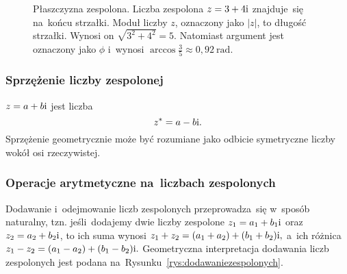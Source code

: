 \begin{figure}[h]
	\centering
	\caption{Płaszczyzna zespolona. Liczba zespolona $z=3+4{\mathrm i}$
		znajduje~się na~końcu strzałki. Moduł liczby $z$, oznaczony jako $|z|$,
		to długość strzałki. Wynosi on $\sqrt{3^2+4^2}=5$. Natomiast
		argument jest oznaczony jako $\phi$ i~wynosi $\arccos{\frac{3}{5}}\approx 0{,}92\ \mathrm{rad}.$}
	\label{rys:postaćgeometryczna}
\end{figure}

\subsubsection{Sprzężenie liczby zespolonej}
 $z = a + b{\mathrm i}$ jest liczba
$$
	{z}^* = a - b{\mathrm i}.
$$
Sprzężenie geometrycznie może być rozumiane jako odbicie symetryczne liczby wokół osi rzeczywistej.

\subsubsection{Operacje arytmetyczne na~liczbach zespolonych}
Dodawanie i~odejmowanie liczb zespolonych przeprowadza~się w~sposób naturalny, tzn.
jeśli~dodajemy dwie liczby zespolone $z_1 = a_1 + b_1 {\mathrm i}$ oraz~$z_2 = a_2 + b_2 {\mathrm i}$, to
ich suma wynosi
$
	z_1 + z_2 = (a_1 + a_2) + (b_1 + b_2) {\mathrm i},
$
a~ich różnica
$
	z_1 - z_2 = (a_1 - a_2) + (b_1 - b_2) {\mathrm i}.
$
Geometryczna interpretacja dodawania
liczb zespolonych jest podana na~Rysunku~\ref{rys:dodawaniezespolonych}.

